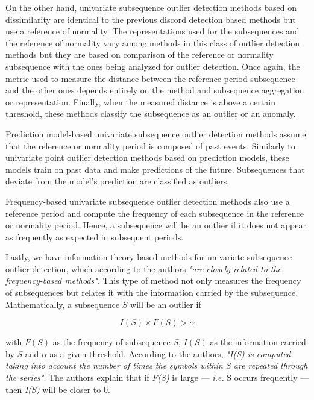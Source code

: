 On the other hand, univariate subsequence outlier detection methods based on dissimilarity are identical to the previous discord detection based methods but use a reference of normality. The representations used for the subsequences and the reference of normality vary among methods in this class of outlier detection methods but they are based on comparison of the reference or normality subsequence with the ones being analyzed for outlier detection. Once again, the metric used to measure the distance between the reference period subsequence and the other ones depends entirely on the method and subsequence aggregation or representation. Finally, when the measured distance is above a certain threshold, these methods classify the subsequence as an outlier or an anomaly.

Prediction model-based univariate subsequence outlier detection methods assume that the reference or normality period is composed of past events. Similarly to univariate point outlier detection methods based on prediction models, these models train on past data and make predictions of the future. Subsequences that deviate from the model's prediction are classified as outliers.

Frequency-based univariate subsequence outlier detection methods also use a reference period and compute the frequency of each subsequence in the reference or normality period. Hence, a subsequence will be an outlier if it does not appear as frequently as expected in subsequent periods.

Lastly, we have information theory based methods for univariate subsequence outlier detection, which according to the authors \textit{"are closely related to the frequency-based methods"}. This type of method not only measures the frequency of subsequences but relates it with the information carried by the subsequence. Mathematically, a subsequence $S$ will be an outlier if

\begin{equation*}
    I(S) \times F(S) > \alpha
\end{equation*}

with $F(S)$ as the frequency of subsequence $S$, $I(S)$ as the information carried by $S$ and $\alpha$ as a given threshold. According to the authors, \textit{"I(S) is computed taking into account the number of times the symbols within S are repeated through the series"}. The authors explain that if \textit{F(S)} is large --- \textit{i.e.} S occurs frequently --- then \textit{I(S)} will be closer to 0.

